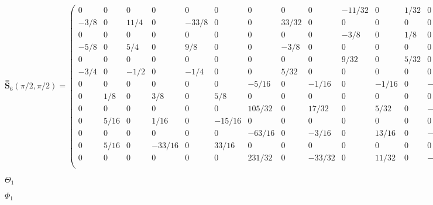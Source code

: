 \documentclass[twoside]{article}
\def\lthtmlcheckvsize{\ifdim\ht\sizebox<\vsize 
  \ifdim\wd\sizebox<\hsize\expandafter\hfill\fi \expandafter\vfill
  \else\expandafter\vss\fi}%
\begin{document}
{\newpage\clearpage
{}%
$\displaystyle
 \stackrel{=}{\mathbf S}_6(\pi/2,\pi/2) = \left(
\begin{array}{ccccccccccccc}
   0 &    0 &    0 &      0 &     0 &      0 &      0 &     0 &      0 & -11/32 &     0 & %
1/32 &      0 \\
-3/8 &    0 & 11/4 &      0 & -33/8 &      0 &      0 & 33/32 &      0 &      0 &     0 &    %
0 &      0 \\
   0 &    0 &    0 &      0 &     0 &      0 &      0 &     0 &      0 &   -3/8 &     0 &  %
1/8 &      0 \\
-5/8 &    0 &  5/4 &      0 &   9/8 &      0 &      0 &  -3/8 &      0 &      0 &     0 &    %
0 &      0 \\
   0 &    0 &    0 &      0 &     0 &      0 &      0 &     0 &      0 &   9/32 &     0 & %
5/32 &      0 \\
-3/4 &    0 & -1/2 &      0 &  -1/4 &      0 &      0 &  5/32 &      0 &      0 &     0 &    %
0 &      0 \\
   0 &    0 &    0 &      0 &     0 &      0 &  -5/16 &     0 &  -1/16 &      0 & -1/16 &    %
0 &  -1/16 \\
   0 &  1/8 &    0 &    3/8 &     0 &    5/8 &      0 &     0 &      0 &      0 &     0 &    %
0 &      0 \\
   0 &    0 &    0 &      0 &     0 &      0 & 105/32 &     0 &  17/32 &      0 &  5/32 &    %
0 & -15/32 \\
   0 & 5/16 &    0 &   1/16 &     0 & -15/16 &      0 &     0 &      0 &      0 &     0 &    %
0 &      0 \\
   0 &    0 &    0 &      0 &     0 &      0 & -63/16 &     0 &  -3/16 &      0 & 13/16 &    %
0 &  -3/16 \\
   0 & 5/16 &    0 & -33/16 &     0 &  33/16 &      0 &     0 &      0 &      0 &     0 &    %
0 &      0 \\
   0 &    0 &    0 &      0 &     0 &      0 & 231/32 &     0 & -33/32 &      0 & 11/32 &    %
0 &  -1/32 \\
\end{array} \right)
$%
\lthtmlindisplaymathZ
\lthtmlcheckvsize\clearpage}

{\newpage\clearpage
{}%
$\Theta_1$%
\lthtmlindisplaymathZ
\lthtmlcheckvsize\clearpage}

{\newpage\clearpage
{}%
$\Phi_1$%
\lthtmlindisplaymathZ
\lthtmlcheckvsize\clearpage}
\end{document}
